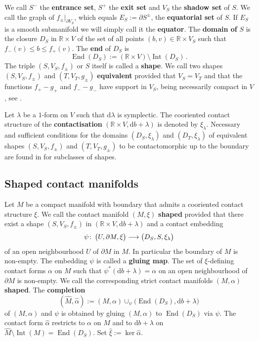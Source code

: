 \documentclass{amsart}
\theoremstyle{definition}
\def\co{\colon\thinspace}
\newcommand{\rmd}{\mathrm d}
\newcommand{\R}{\mathbb R}
\newcommand{\lra}{\longrightarrow}
\DeclareMathOperator{\End}{\mathrm{End}}
\DeclareMathOperator{\Int}{\mathrm{Int}}
\begin{document}
We call $S^-$ the {\bf entrance set}, $S^+$ the {\bf exit set}
and $V_S$ the {\bf shadow set} of $S$.
We call the graph of $f_{\pm}|_{\partial V_S}$,
which equals $E_S:=\partial S^{\pm}$,
the {\bf equatorial set} of $S$.
If $E_S$ is a smooth submanifold
we will simply call it the {\bf equator}.
The {\bf domain of} $S$ is the closure $D_S$
in $\R\times V$ of the set of all points
$(b,v)\in\R\times V_S$
such that $f_-(v)\leq b\leq f_+(v)$.
The {\bf end} of $D_S$ is
\[
\End(D_S):=
(\R\times V)\setminus\Int(D_S)
\,.
\]
The triple $(S,V_S,f_{\pm})$ or $S$ itself
is called a {\bf shape}.
We call two shapes $(S,V_S,f_{\pm})$ and $(T,V_T,g_{\pm})$
{\bf equivalent} provided that $V_S=V_T$ and that
the functions $f_+-g_+$ and $f_--g_-$ have support in $V_S$,
being necessarily compact in $V$,
see \cite{efz}.

Let $\lambda$ be a $1$-form on $V$
such that $\rmd\lambda$ is symplectic.
The cooriented contact structure of the
{\bf contactisation} $(\R\times V,\rmd b+\lambda)$
is denoted by $\xi_{\lambda}$.
Necessary and sufficient conditions for the domains
$(D_S,\xi_{\lambda})$ and $(D_T,\xi_{\lambda})$
of equivalent shapes $(S,V_S,f_{\pm})$ and $(T,V_T,g_{\pm})$
to be contactomorphic up to the boundary
are found in \cite{efz} for subclasses of shapes.



\subsection{Shaped contact manifolds}
\label{subsec:shapedcontactmanifolds}

Let $M$ be a compact manifold with boundary
that admits a cooriented contact structure $\xi$.
We call the contact manifold $(M,\xi)$ {\bf shaped}
provided that there exist a shape $(S,V_S,f_{\pm})$
in $(\R\times V,\rmd b+\lambda)$
and a contact embedding
\[
\psi\co
\big(U,\partial M,\xi\big)
\lra
\big(D_S,S,\xi_{\lambda}\big)
\]
of an open neighbourhood $U$ of $\partial M$ in $M$.
In particular the boundary of $M$ is non-empty.
The embedding $\psi$ is called a {\bf gluing map}.
The set of $\xi$-defining contact forms $\alpha$ on $M$
such that $\psi^*(\rmd b+\lambda)=\alpha$
on an open neighbourhood of $\partial M$
is non-empty.
We call the corresponding strict contact manifolds $(M,\alpha)$ {\bf shaped}.
The {\bf completion}
\[
(\hat{M},\hat{\alpha}):=
(M,\alpha)\cup_{\psi}
\big(\!\End(D_S),\rmd b+\lambda\big)
\]
of $(M,\alpha)$ and $\psi$
is obtained by gluing $(M,\alpha)$
to $\End(D_S)$ via $\psi$.
The contact form $\hat{\alpha}$ restricts
to $\alpha$ on $M$ and to $\rmd b+\lambda$ on
$\hat{M}\setminus\Int(M)=\End(D_S)$.
Set $\hat{\xi}:=\ker\hat{\alpha}$.
\end{document}
